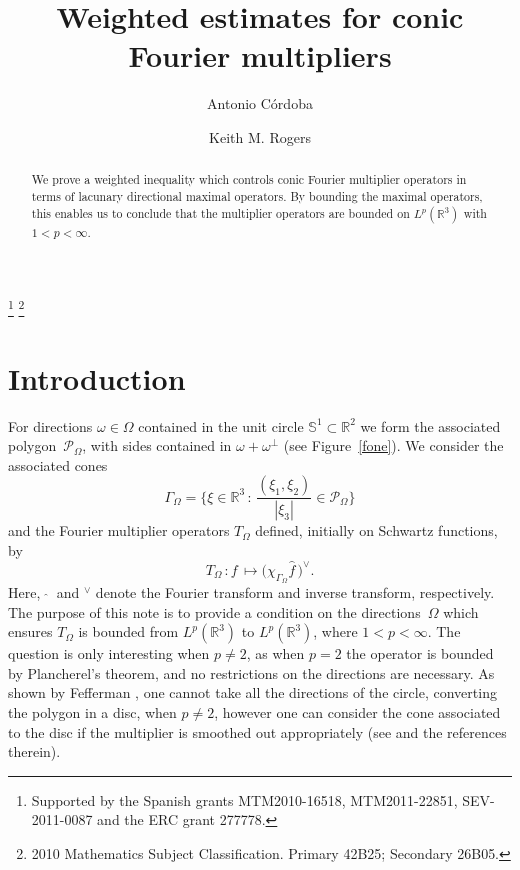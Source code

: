 \documentclass[11pt]{amsart}
\theoremstyle{definition}
\theoremstyle{remark}
\begin{document}
\title[On conic Fourier multipliers]
{Weighted estimates for conic\\ Fourier multipliers}

\address{Departamento de Matem\'aticas -- Universidad Aut\'onoma de Madrid, 28049 Madrid, Spain}
\address{Instituto de Ciencias Matem\'aticas CSIC-UAM-UC3M-UCM, 28049 Madrid, Spain}
\thanks{Supported by the Spanish grants MTM2010-16518, MTM2011-22851, SEV-2011-0087 and the ERC grant 277778.} 
\thanks{2010 Mathematics Subject Classification. Primary 42B25;
Secondary 26B05.}
\author{Antonio C\'ordoba}
\author{Keith M. Rogers}

\maketitle

\begin{abstract} We prove a weighted inequality which  controls conic Fourier multiplier operators in terms of lacunary 
directional maximal operators. By bounding the maximal operators, this enables us to conclude that
the multiplier operators are bounded on $L^p(\mathbb{R}^3)$  with $1<p<\infty$.
\end{abstract}

\section{Introduction}

For directions $\omega\in \Omega$ contained in the unit circle
$\mathbb{S}^1\subset \mathbb{R}^2$ we form the associated
polygon~$\mathcal{P}_\Omega$, with sides contained in
$\omega+\omega^\perp$ (see Figure~\ref{fone}). We consider the associated cones
$$
\Gamma_{\!\Omega}=\Big\{ \xi\in \mathbb{R}^3\, :\, \frac{(\xi_1,\xi_2)}{|\xi_3|} \in \mathcal{P}_\Omega \Big\}
$$
and the Fourier multiplier operators $T_{\Omega}$ defined, initially on Schwartz functions, by
$$
T_{\Omega}\,:f\,\mapsto\Big(\chi_{\Gamma_{\!\Omega}} \widehat{f}\,\Big)^\vee.
$$
Here,  $\,\widehat{\,}\,$ and $^\vee$ denote the Fourier transform
and inverse transform, respectively. The purpose of this note is to
provide a condition on the directions~$\Omega$ which ensures
$T_{\Omega}$ is bounded from $L^p(\mathbb{R}^3)$ to $L^p(\mathbb{R}^3)$, where
$1<p<\infty$. The question is only interesting when $p\neq
2$, as when $p=2$ the operator is bounded by Plancherel's theorem, and no
restrictions on the directions are necessary. As shown by Fefferman \cite{F}, one cannot take all the directions of the circle, converting the polygon in a disc, when $p\neq 2$,  however one can consider the cone associated to the disc if the multiplier is smoothed out appropriately (see \cite{LV} and the references therein).
\end{document}
